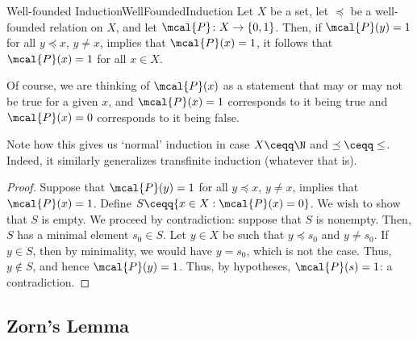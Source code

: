 \begin{thm}{Well-founded Induction}{WellFoundedInduction}
	Let $X$ be a set, let $\preceq$ be a well-founded relation on $X$, and let $\mcal{P}\colon X\rightarrow \{ 0,1\}$.  Then, if $\mcal{P}(y)=1$ for all $y\preceq x$, $y\neq x$, implies that $\mcal{P}(x)=1$, it follows that $\mcal{P}(x)=1$ for all $x\in X$.
	\begin{rmk}
		Of course, we are thinking of $\mcal{P}(x)$ as a statement that may or may not be true for a given $x$, and $\mcal{P}(x)=1$ corresponds to it being true and $\mcal{P}(x)=0$ corresponds to it being false.
	\end{rmk}
	\begin{rmk}
		Note how this gives us `normal' induction in case $X\ceqq \N$ and $\preceq \ceqq \leq$.  Indeed, it similarly generalizes transfinite induction (whatever that is).
	\end{rmk}
	\begin{proof}
		Suppose that $\mcal{P}(y)=1$ for all $y\preceq x$, $y\neq x$, implies that $\mcal{P}(x)=1$.  Define $S\ceqq \{ x\in X:\mcal{P}(x)=0\}$.  We wish to show that $S$ is empty.  We proceed by contradiction:  suppose that $S$ is nonempty.  Then, $S$ has a minimal element $s_0\in S$.  Let $y\in X$ be such that $y\preceq s_0$ and $y\neq s_0$.  If $y\in S$, then by minimality, we would have $y=s_0$, which is not the case.  Thus, $y\notin S$, and hence $\mcal{P}(y)=1$.  Thus, by hypotheses, $\mcal{P}(s)=1$:  a contradiction.
	\end{proof}
\end{thm}

\subsection{Zorn's Lemma}

